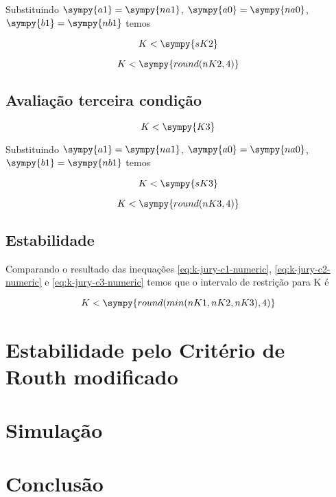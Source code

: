 \documentclass[a4paper,11pt]{article}
\newcommand{\npy}[1]{\sympy{round(#1,4)}}
\begin{document}
Substituindo $\sympy{a1} = \sympy{na1}$, $\sympy{a0} = \sympy{na0}$, $\sympy{b1} = \sympy{nb1}$ temos

$$K < \sympy{sK2}$$

\begin{equation}\label{eq:k-jury-c2-numeric}
    K < \npy{nK2}
\end{equation}

\subsection{Avaliação terceira condição}

\begin{equation}\label{eq:k-jury-c3}
    K < \sympy{K3}
\end{equation}

Substituindo $\sympy{a1} = \sympy{na1}$, $\sympy{a0} = \sympy{na0}$, $\sympy{b1} = \sympy{nb1}$ temos

$$K < \sympy{sK3}$$

\begin{equation}\label{eq:k-jury-c3-numeric}
    K < \npy{nK3}
\end{equation}

\subsection{Estabilidade}

Comparando o resultado das inequações \ref{eq:k-jury-c1-numeric}, \ref{eq:k-jury-c2-numeric} e \ref{eq:k-jury-c3-numeric} temos que o intervalo de restrição para K é

\begin{equation}\label{eq:k-jury-result}
    K < \sympy{round(min(nK1,nK2,nK3),4)}
\end{equation}


\section{Estabilidade pelo Critério de Routh modificado}


\section{Simulação}


\section{Conclusão}






\end{document}
